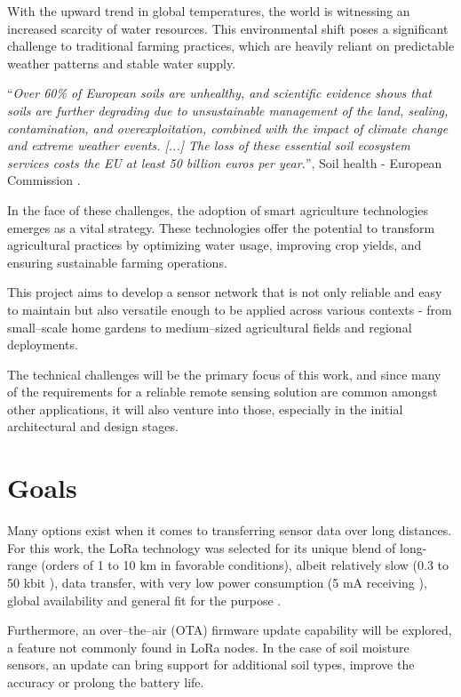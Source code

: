 
With the upward trend in global temperatures, the world is witnessing an increased scarcity of water resources. This environmental shift poses a significant challenge to traditional farming practices, which are heavily reliant on predictable weather patterns and stable water supply. 

``\emph{Over 60\% of European soils are unhealthy, and scientific evidence shows that soils are further degrading due to unsustainable management of the land, sealing, contamination, and overexploitation, combined with the impact of climate change and extreme weather events. [...] The loss of these essential soil ecosystem services costs the EU at least 50 billion euros per year.}'', Soil health - European Commission \cite{european_commission_soil_2024}.

In the face of these challenges, the adoption of smart agriculture technologies emerges as a vital strategy. These technologies offer the potential to transform agricultural practices by optimizing water usage, improving crop yields, and ensuring sustainable farming operations.

This project aims to develop a sensor network that is not only reliable and easy to maintain but also versatile enough to be applied across various contexts - from small--scale home gardens to medium--sized agricultural fields and regional deployments. 

The technical challenges will be the primary focus of this work, and since many of the requirements for a reliable remote sensing solution are common amongst other applications, it will also venture into those, especially in the initial architectural and design stages. 

\section{Goals}
Many options exist when it comes to transferring sensor data over long distances. For this work, the LoRa technology \cite{semtech_corporation_sx12612_2024,stmicroelectronics_lora_2024} was selected for its unique blend of long-range (orders of 1 to 10 km in favorable conditions), albeit relatively slow (0.3 to 50 kbit \cite{semtech_corporation_sx12612_2024}), data transfer, with very low power consumption (5 mA receiving \cite{semtech_corporation_sx12612_2024}), global availability and general fit for the purpose \cite{the_things_network_things_nodate}.

Furthermore, an over--the--air (OTA) firmware update capability will be explored, a feature not commonly found in LoRa nodes. In the case of soil moisture sensors, an update can bring support for additional soil types, improve the accuracy or prolong the battery life. 

